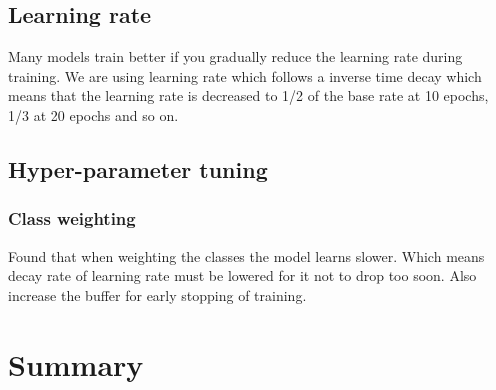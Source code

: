 \documentclass[thesis.tex]{subfiles}
\begin{document}
\subsection{Learning rate}
Many models train better if you gradually reduce the learning rate during training. We are using learning rate which follows a inverse time decay which means that the learning rate is decreased to 1/2 of the base rate at 10 epochs, 1/3 at 20 epochs and so on.



\subsection{Hyper-parameter tuning}

\subsubsection{Class weighting}
Found that when weighting the classes the model learns slower. Which means decay rate of learning rate must be lowered for it not to drop too soon. Also increase the buffer for early stopping of training.




\section{Summary} \label{sec:C3-summary}
\end{document}
